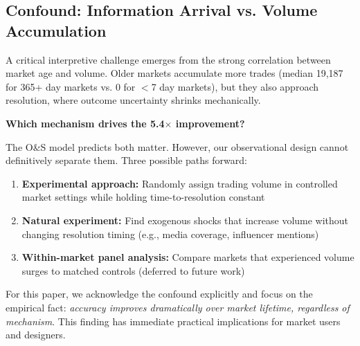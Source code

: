 \documentclass[12pt,letterpaper]{article}
\begin{document}
\subsection{Confound: Information Arrival vs. Volume Accumulation}

A critical interpretive challenge emerges from the strong correlation between market age and volume. Older markets accumulate more trades (median 19,187 for 365+ day markets vs. 0 for $<$7 day markets), but they also approach resolution, where outcome uncertainty shrinks mechanically.

\textbf{Which mechanism drives the 5.4$\times$ improvement?}

The O\&S model predicts both matter. However, our observational design cannot definitively separate them. Three possible paths forward:

\begin{enumerate}
    \item \textbf{Experimental approach:} Randomly assign trading volume in controlled market settings while holding time-to-resolution constant
    \item \textbf{Natural experiment:} Find exogenous shocks that increase volume without changing resolution timing (e.g., media coverage, influencer mentions)
    \item \textbf{Within-market panel analysis:} Compare markets that experienced volume surges to matched controls (deferred to future work)
\end{enumerate}

For this paper, we acknowledge the confound explicitly and focus on the empirical fact: \textit{accuracy improves dramatically over market lifetime, regardless of mechanism}. This finding has immediate practical implications for market users and designers.
\end{document}
